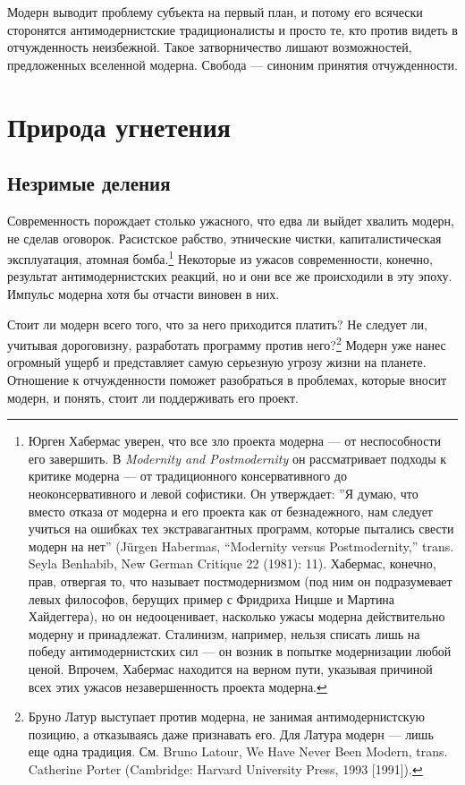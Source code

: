 \documentclass[12pt]{book}
\begin{document}
Модерн выводит проблему субъекта на первый план, и потому его всячески сторонятся антимодернистские традиционалисты и просто те, кто против видеть в отчужденность неизбежной. Такое затворничество лишают возможностей, предложенных вселенной модерна. Свобода --- синоним принятия отчужденности.

\chapter{Природа угнетения}

\section{Незримые деления}

Современность порождает столько ужасного, что едва ли выйдет хвалить модерн, не сделав оговорок. Расистское рабство, этнические чистки, капиталистическая эксплуатация, атомная бомба.\footnote{Юрген Хабермас уверен, что все зло проекта модерна --- от неспособности его завершить. В \textit{Modernity and Postmodernity} он рассматривает подходы к критике модерна --- от традиционного консервативного до неоконсервативного и левой софистики. Он утверждает: ''Я думаю, что вместо отказа от модерна и его проекта как от безнадежного, нам следует учиться на ошибках тех экстравагантных программ, которые пытались свести модерн на нет'' (Jürgen Habermas, “Modernity versus Postmodernity,” trans. Seyla Benhabib, New German Critique 22 (1981): 11). Хабермас, конечно, прав, отвергая то, что называет постмодернизмом (под ним он подразумевает левых философов, берущих пример с Фридриха Ницше и Мартина Хайдеггера), но он недооценивает, насколько ужасы модерна действительно модерну и принадлежат. Сталинизм, например, нельзя списать лишь на победу антимодернистских сил --- он возник в попытке модернизации любой ценой. Впрочем, Хабермас находится на верном пути, указывая причиной всех этих ужасов незавершенность проекта модерна.} Некоторые из ужасов современности, конечно, результат антимодернистских реакций, но и они все же происходили в эту эпоху. Импульс модерна хотя бы отчасти виновен в них.

Стоит ли модерн всего того, что за него приходится платить? Не следует ли, учитывая дороговизну, разработать программу против него?\footnote{Бруно Латур выступает против модерна, не занимая антимодернистскую позицию, а отказываясь даже признавать его. Для Латура модерн --- лишь еще одна традиция. См. Bruno
Latour, We Have Never Been Modern, trans. Catherine Porter (Cambridge: Harvard University Press, 1993 [1991]).} Модерн уже нанес огромный ущерб и представляет самую серьезную угрозу жизни на планете. Отношение к отчужденности поможет разобраться в проблемах, которые вносит модерн, и понять, стоит ли поддерживать его проект.
\end{document}
